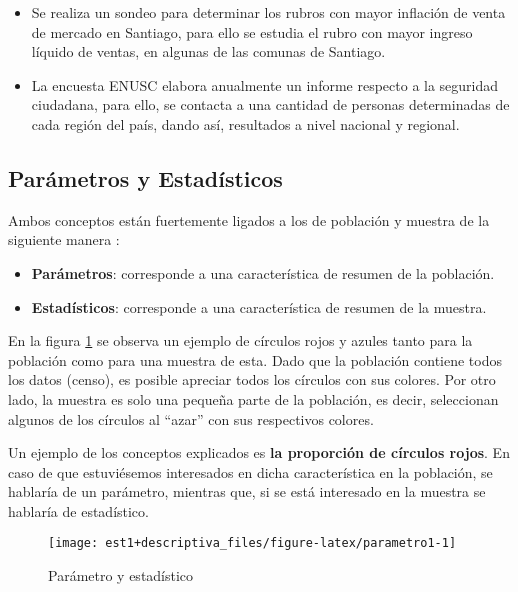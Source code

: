 \documentclass[
]{book}
\providecommand{\tightlist}{%
  \setlength{\itemsep}{0pt}\setlength{\parskip}{0pt}}
\begin{document}
\begin{itemize}
\tightlist
\item
  Se realiza un sondeo para determinar los rubros con mayor inflación de venta de mercado en Santiago, para ello se estudia el rubro con mayor ingreso líquido de ventas, en algunas de las comunas de Santiago.
\item
  La encuesta ENUSC elabora anualmente un informe respecto a la seguridad ciudadana, para ello, se contacta a una cantidad de personas determinadas de cada región del país, dando así, resultados a nivel nacional y regional.
\end{itemize}

\hypertarget{paruxe1metros-y-estaduxedsticos}{%
\subsection{Parámetros y Estadísticos}\label{paruxe1metros-y-estaduxedsticos}}

Ambos conceptos están fuertemente ligados a los de población y muestra de la siguiente manera \citep[página 83]{anderson_estadistica_2008}:

\begin{itemize}
\tightlist
\item
  \textbf{Parámetros}: corresponde a una característica de resumen de la población.
\item
  \textbf{Estadísticos}: corresponde a una característica de resumen de la muestra.
\end{itemize}

En la figura \ref{fig:parametro1} se observa un ejemplo de círculos rojos y azules tanto para la población como para una muestra de esta. Dado que la población contiene todos los datos (censo), es posible apreciar todos los círculos con sus colores. Por otro lado, la muestra es solo una pequeña parte de la población, es decir, seleccionan algunos de los círculos al ``azar'' con sus respectivos colores.

Un ejemplo de los conceptos explicados es \textbf{la proporción de círculos rojos}. En caso de que estuviésemos interesados en dicha característica en la población, se hablaría de un parámetro, mientras que, si se está interesado en la muestra se hablaría de estadístico.

\begin{figure}

{\centering \texttt{[image: est1+descriptiva\_files/figure-latex/parametro1-1]} 

}

\caption{Parámetro y estadístico}\label{fig:parametro1}
\end{figure}
\end{document}
